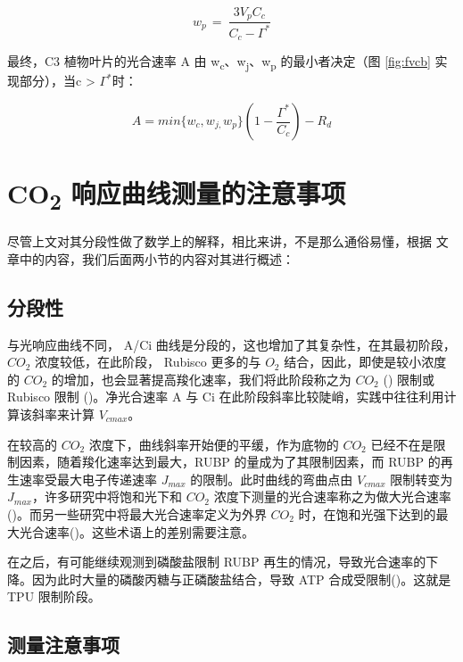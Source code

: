 \documentclass[]{krantz}
\theoremstyle{definition}
\theoremstyle{definition}
\theoremstyle{definition}
\theoremstyle{remark}
\begin{document}
\begin{equation}
w_{p\ }=\ \frac{3V_{p}C_{c}}{C_{c}-\Gamma^{*}}
\label{eq:wp}
\end{equation}

最终，C3 植物叶片的光合速率 A 由
w\textsubscript{c}、w\textsubscript{j}、w\textsubscript{p}
的最小者决定（图 \ref{fig:fvcb} 实现部分），当c \textgreater{}
\(\Gamma^{*}\)时：

\begin{equation}
A=min\{w_{c},w_{j,}w_{p}\}(1-\frac{\Gamma^{*}}{C_{c}})-R_{d}
\label{eq:fvcbfin}
\end{equation}

\section{\texorpdfstring{CO\textsubscript{2}
响应曲线测量的注意事项}{CO2 响应曲线测量的注意事项}}\label{co2_note}

尽管上文对其分段性做了数学上的解释，相比来讲，不是那么通俗易懂，根据
\citet{matthew2018} 文章中的内容，我们后面两小节的内容对其进行概述：

\subsection{分段性}\label{model_3}

与光响应曲线不同， A/Ci
曲线是分段的，这也增加了其复杂性，在其最初阶段，\(CO_2\)
浓度较低，在此阶段， Rubisco 更多的与 \(O_2\)
结合，因此，即使是较小浓度的 \(CO_2\)
的增加，也会显著提高羧化速率，我们将此阶段称之为 \(CO_2\)
(\citet{Wullschleger1993Biochemical}) 限制或 Rubisco 限制
(\citet{Long2003Gas})。净光合速率 A 与 Ci
在此阶段斜率比较陡峭，实践中往往利用计算该斜率来计算 \(V_{cmax}\)。

在较高的 \(CO_2\) 浓度下，曲线斜率开始便的平缓，作为底物的 \(CO_2\)
已经不在是限制因素，随着羧化速率达到最大，RUBP 的量成为了其限制因素，而
RUBP 的再生速率受最大电子传递速率 \(J_{max}\) 的限制。此时曲线的弯曲点由
\(V_{cmax}\) 限制转变为 \(J_{max}\)，许多研究中将饱和光下和 \(CO_2\)
浓度下测量的光合速率称之为做大光合速率(\citet{heath2005rising})。而另一些研究中将最大光合速率定义为外界
\(CO_2\)
时，在饱和光强下达到的最大光合速率(\citet{marshall1980a})。这些术语上的差别需要注意。

在之后，有可能继续观测到磷酸盐限制 RUBP
再生的情况，导致光合速率的下降。因为此时大量的磷酸丙糖与正磷酸盐结合，导致
ATP 合成受限制(\citet{ellsworth2015phosphorus})。这就是 TPU 限制阶段。

\subsection{测量注意事项}\label{note_detail}
\end{document}
